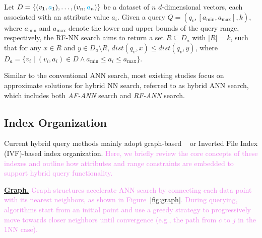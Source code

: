\documentclass[sigconf, nonacm]{acmart}
\begin{document}
	
	\begin{definition}[RF-NN Search]
		
		Let \( D = \{(v_1, \textcolor{cyan}{a}_1), \ldots, (v_n, \textcolor{cyan}{a}_n)\} \) be a dataset of \( n \) \( d \)-dimensional vectors, each associated with an attribute value \( a_i \). Given a query \( Q = (q_v, [a_{\min}, a_{\max}], k) \), where \( a_{\min} \) and \( a_{\max} \) denote the lower and upper bounds of the query range, respectively, the RF-NN search aims to return a set \( R \subseteq D_a \) with \( |R| = k \), such that for any \( x \in R \) and \( y \in D_a \setminus R \), \( \textit{dist}(q_v, x) \leq \textit{dist}(q_v, y) \), where \( D_a = \{ v_i \mid (v_i, a_i) \in D \land a_{\min} \leq a_i \leq a_{\max} \} \).
	\end{definition}
	
	
	
	Similar to the conventional ANN search, most existing studies focus on approximate solutions for hybrid NN search, referred to as hybrid ANN search, which includes both \textit{AF-ANN} search and \textit{RF-ANN} search.
	
	
	
	\subsection{Index Organization }
	
	Current hybrid query methods mainly adopt graph-based ~\cite{nsw,kgraph,nsg,fanng,ngt} or Inverted File Index (IVF)-based \cite{PQ} index organization. 
	\textcolor{violet}{Here, we briefly review the core concepts of these indexes and outline how attributes and range constraints are embedded to support hybrid query functionality.}
	
	\noindent\textbf{\underline{Graph.}}
	\textcolor{violet}{Graph structures accelerate ANN search by connecting each data point with its nearest neighbors, as shown in Figure~\ref{fig:graph}. During querying, algorithms start from an initial point and use a greedy strategy to progressively move towards closer neighbors until convergence (e.g., the path from $c$ to $j$ in the 1NN case).}
	
\end{document}
